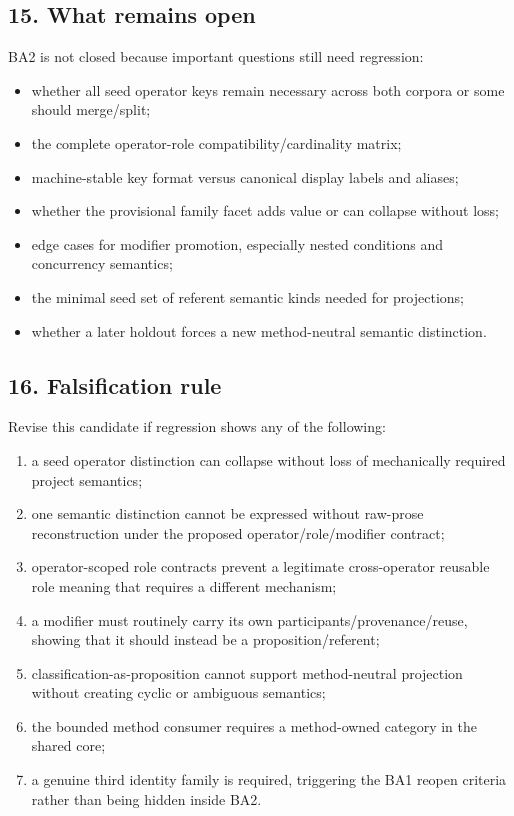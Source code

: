 \documentclass[
  10pt,
  letterpaper,
]{article}
\providecommand{\tightlist}{%
  \setlength{\itemsep}{0pt}\setlength{\parskip}{0pt}}
\begin{document}
\subsection{15. What remains open}\label{what-remains-open}

BA2 is not closed because important questions still need regression:

\begin{itemize}
\tightlist
\item
  whether all seed operator keys remain necessary across both corpora or
  some should merge/split;
\item
  the complete operator-role compatibility/cardinality matrix;
\item
  machine-stable key format versus canonical display labels and aliases;
\item
  whether the provisional family facet adds value or can collapse
  without loss;
\item
  edge cases for modifier promotion, especially nested conditions and
  concurrency semantics;
\item
  the minimal seed set of referent semantic kinds needed for
  projections;
\item
  whether a later holdout forces a new method-neutral semantic
  distinction.
\end{itemize}

\subsection{16. Falsification rule}\label{falsification-rule}

Revise this candidate if regression shows any of the following:

\begin{enumerate}
\def\labelenumi{\arabic{enumi}.}
\tightlist
\item
  a seed operator distinction can collapse without loss of mechanically
  required project semantics;
\item
  one semantic distinction cannot be expressed without raw-prose
  reconstruction under the proposed operator/role/modifier contract;
\item
  operator-scoped role contracts prevent a legitimate cross-operator
  reusable role meaning that requires a different mechanism;
\item
  a modifier must routinely carry its own participants/provenance/reuse,
  showing that it should instead be a proposition/referent;
\item
  classification-as-proposition cannot support method-neutral projection
  without creating cyclic or ambiguous semantics;
\item
  the bounded method consumer requires a method-owned category in the
  shared core;
\item
  a genuine third identity family is required, triggering the BA1 reopen
  criteria rather than being hidden inside BA2.
\end{enumerate}
\end{document}
